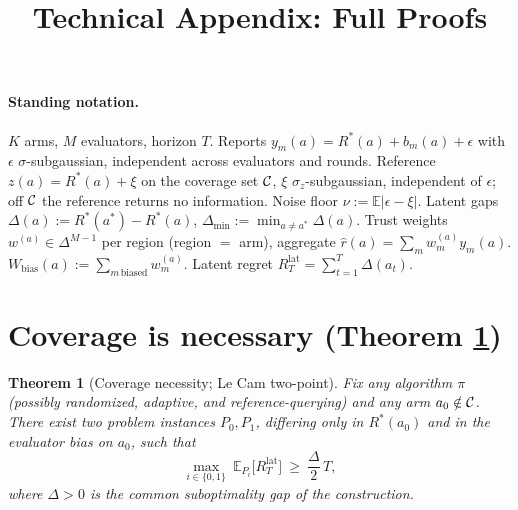 \documentclass[11pt]{article}
\title{Technical Appendix: Full Proofs}
\author{}
\date{}
\newtheorem{theorem}{Theorem}
\theoremstyle{definition}\newtheorem{definition}{Definition}
\theoremstyle{definition}\newtheorem{assumption}{Assumption}
\newcommand{\Rstar}{R^{\ast}}\newcommand{\astar}{a^{\ast}}
\newcommand{\E}{\mathbb{E}}\newcommand{\Prob}{\mathbb{P}}
\newcommand{\nfl}{\nu}                      %
\begin{document}
\maketitle

\paragraph{Standing notation.}
$K$ arms, $M$ evaluators, horizon $T$. Reports $y_m(a)=\Rstar(a)+b_m(a)+\epsilon$
with $\epsilon$ $\sigma$-subgaussian, independent across evaluators and rounds.
Reference $z(a)=\Rstar(a)+\xi$ on the coverage set $\mathcal{C}$, $\xi$
$\sigma_z$-subgaussian, independent of $\epsilon$; off $\mathcal{C}$ the reference returns
no information. Noise floor $\nfl:=\E|\epsilon-\xi|$. Latent gaps
$\Delta(a):=\Rstar(\astar)-\Rstar(a)$, $\Delta_{\min}:=\min_{a\neq\astar}\Delta(a)$.
Trust weights $w^{(a)}\in\Delta^{M-1}$ per region (region $=$ arm), aggregate
$\hat r(a)=\sum_m w_m^{(a)}y_m(a)$. $W_{\mathrm{bias}}(a):=\sum_{m\,\text{biased}}w_m^{(a)}$.
Latent regret $R_T^{\mathrm{lat}}=\sum_{t=1}^{T}\Delta(a_t)$.

\section{Coverage is necessary (Theorem \texorpdfstring{\ref*{thm:lower}}{2})}
\label{app:lower}

\begin{theorem}[Coverage necessity; Le Cam two-point]\label{thm:lower}
Fix any algorithm $\pi$ (possibly randomized, adaptive, and reference-querying)
and any arm $a_0\notin\mathcal{C}$. There exist two problem instances $P_0,P_1$, differing
only in $\Rstar(a_0)$ and in the evaluator bias on $a_0$, such that
\[
\max_{i\in\{0,1\}}\ \E_{P_i}\!\big[R_T^{\mathrm{lat}}\big]\ \ge\ \frac{\Delta}{2}\,T ,
\]
where $\Delta>0$ is the common suboptimality gap of the construction.
\end{theorem}
\end{document}
